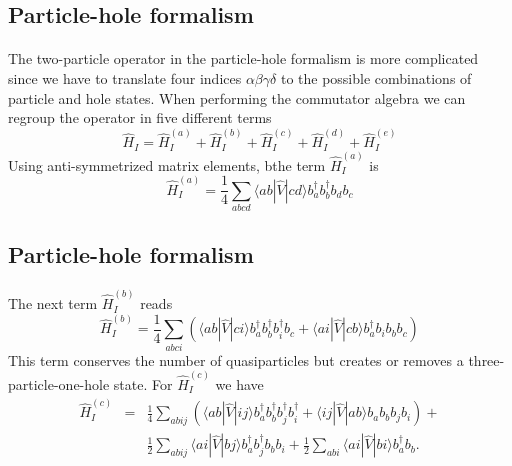 \documentclass[%
twoside,                 %
final,                   %
10pt]{article}
\begin{document}
\subsection*{Particle-hole formalism}

\paragraph{}
The two-particle operator in the particle-hole formalism  is more complicated since we have
to translate four indices $\alpha\beta\gamma\delta$ to the possible combinations of particle and hole
states.  When performing the commutator algebra we can regroup the operator in five different terms
\begin{equation}
	\hat{H}_I = \hat{H}_I^{(a)} + \hat{H}_I^{(b)} + \hat{H}_I^{(c)} + \hat{H}_I^{(d)} + \hat{H}_I^{(e)} \label{eq:2-65}
\end{equation}
Using anti-symmetrized  matrix elements, 
bthe term  $\hat{H}_I^{(a)}$ is  
\begin{equation}
	\hat{H}_I^{(a)} = \frac{1}{4}
	\sum_{abcd} \langle ab|\hat{V}|cd\rangle 
		b_a^\dagger b_b^\dagger b_d b_c \label{eq:2-66}
\end{equation}



\subsection*{Particle-hole formalism}

\paragraph{}
The next term $\hat{H}_I^{(b)}$  reads
\begin{equation}
	 \hat{H}_I^{(b)} = \frac{1}{4} \sum_{abci}\left(\langle ab|\hat{V}|ci\rangle b_a^\dagger b_b^\dagger b_i^\dagger b_c +\langle ai|\hat{V}|cb\rangle b_a^\dagger b_i b_b b_c\right) \label{eq:2-67b}
\end{equation}
This term conserves the number of quasiparticles but creates or removes a 
three-particle-one-hole  state. 
For $\hat{H}_I^{(c)}$  we have
\begin{eqnarray}
	\hat{H}_I^{(c)}& =& \frac{1}{4}
		\sum_{abij}\left(\langle ab|\hat{V}|ij\rangle b_a^\dagger b_b^\dagger b_j^\dagger b_i^\dagger +
		\langle ij|\hat{V}|ab\rangle b_a  b_b b_j b_i \right)+  \nonumber \\
	&&	\frac{1}{2}\sum_{abij}\langle ai|\hat{V}|bj\rangle b_a^\dagger b_j^\dagger b_b b_i + 
		\frac{1}{2}\sum_{abi}\langle ai|\hat{V}|bi\rangle b_a^\dagger b_b. \label{eq:2-68c}
\end{eqnarray}
\end{document}
